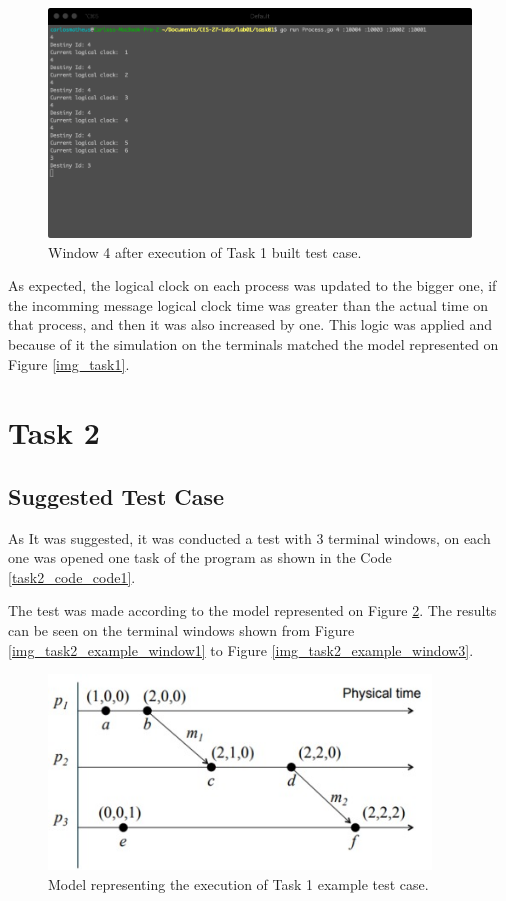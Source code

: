 \documentclass[a4paper, 11pt]{article}
\begin{document}
\begin{figure}[h]
  \begin{center}
  \includegraphics[width=4.5in]{./imgs/task1_buit_test_window4.png}
  \caption{Window 4 after execution of Task 1 built test case.}
  \label{img_task1_built_case_window4}
  \end{center}
\end{figure}

As expected, the logical clock on each process was updated to the bigger one, if the incomming message logical clock time was greater than the actual time on that process, and then it was also increased by one. This logic was applied and because of it the simulation on the terminals matched the model represented on Figure \ref{img_task1}.

\section*{Task 2}

\subsection*{Suggested Test Case}

As It was suggested, it was conducted a test with 3 terminal windows, on each one was opened one task of the program as shown in the Code \ref{task2_code_code1}.

The test was made according to the model represented on Figure \ref{task2_example_model}. The results can be seen on the terminal windows shown from Figure \ref{img_task2_example_window1} to Figure \ref{img_task2_example_window3}.

\begin{figure}[h]
  \begin{center}
  \includegraphics[width=4in]{./imgs/task2_example_model.jpeg}
  \caption{Model representing the execution of Task 1 example test case.}
  \label{task2_example_model}
  \end{center}
\end{figure}
\end{document}
